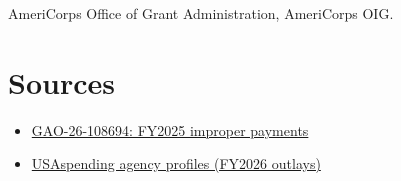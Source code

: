\documentclass[letterpaper,11pt]{article}
\providecommand{\tightlist}{\setlength{\itemsep}{0pt}\setlength{\parskip}{0pt}}
\begin{document}
AmeriCorps Office of Grant Administration, AmeriCorps OIG.

\hypertarget{sources}{%
\section{Sources}\label{sources}}

\begin{itemize}
\tightlist
\item
  \href{https://www.gao.gov/products/gao-26-108694}{GAO-26-108694:
  FY2025 improper payments}
\item
  \href{https://www.usaspending.gov/agency}{USAspending agency profiles
  (FY2026 outlays)}
\end{itemize}
\end{document}
